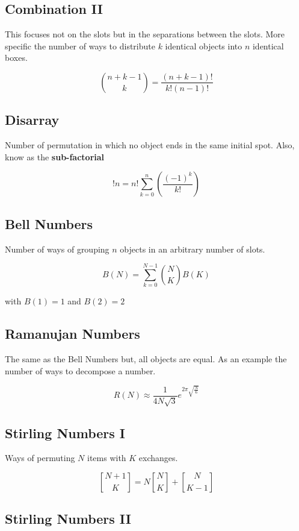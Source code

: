 \subsection{Combination II}

This focuses not on the slots but in the separations between the slots.
More specific the number of ways to distribute \(k\) identical objects into \(n\) identical boxes. 

\[
    \binom{n + k - 1}{k} = \frac{(n + k - 1)!}{k!(n - 1)!}
\]

\subsection{Disarray}

Number of permutation in which no object ends in the same initial spot. Also, know as the \textbf{sub-factorial}

\[
    !n = n! \sum_{k = 0}^{n} \left(\frac{{(-1)}^k}{k!}\right)
\]

\subsection{Bell Numbers}

Number of ways of grouping \(n\) objects in an arbitrary number of slots.

\[
    B(N) = \sum_{k = 0}^{N-1}\binom{N}{K}B(K)
\]

with \(B(1) = 1\) and \(B(2) = 2\)

\subsection{Ramanujan Numbers}

The same as the Bell Numbers but, all objects are equal. As an example the number of ways
to decompose a number.

\[
    R(N) \approx \frac{1}{4N\sqrt{3}} e^{2\pi \sqrt{\frac{N}{6}}}
\]

\subsection{Stirling Numbers I}

Ways of permuting \(N\) items with \(K\) exchanges.

\[
    \genfrac{[}{]}{0pt}{}{N + 1}{K} = N \genfrac{[}{]}{0pt}{}{N}{K} + \genfrac{[}{]}{0pt}{}{N}{K - 1}
\]


\subsection{Stirling Numbers II}

